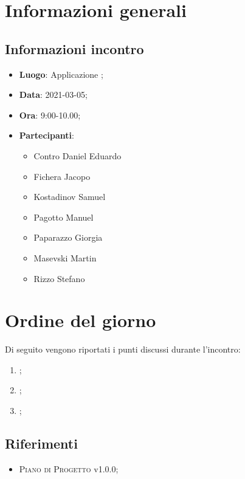 \documentclass{article}
\begin{document}


\section{Informazioni generali}
\label{sec:info_generali}

\subsection{Informazioni incontro}
\label{sub:info_incontro}

\begin{itemize}
	\item \textbf{Luogo}: Applicazione ;
	\item \textbf{Data}: 2021-03-05;
	\item \textbf{Ora}: 9:00-10.00;
	\item \textbf{Partecipanti}:
	\begin{itemize}
		\item Contro Daniel Eduardo
		\item Fichera Jacopo
		\item Kostadinov Samuel
		\item Pagotto Manuel
		\item Paparazzo Giorgia
		\item Masevski Martin
		\item Rizzo Stefano
	\end{itemize}
\end{itemize}

\section{Ordine del giorno}%
\label{sec:ordine_del_giorno}

Di seguito vengono riportati i punti discussi durante l'incontro:
\begin{enumerate}
	\item {};
	\item {};
	\item {};
\end{enumerate}


\subsection{Riferimenti}%
\label{sub:riferimenti}
\begin{itemize}
    \item \textsc{Piano di Progetto} v1.0.0;
    \end{itemize}
\end{document}
